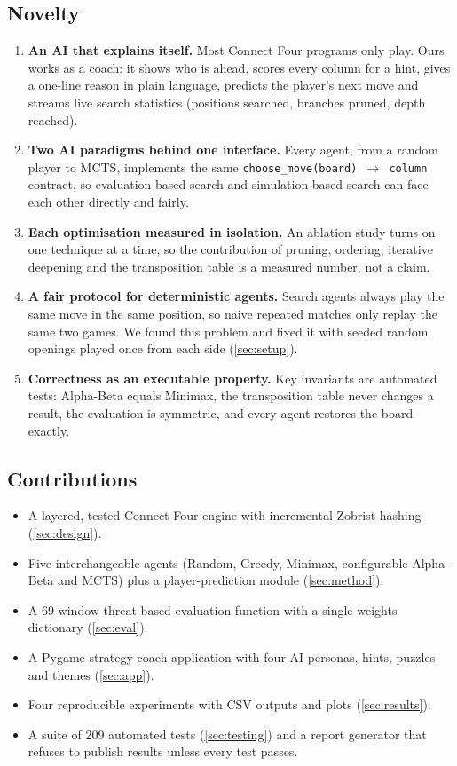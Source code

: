 \documentclass[11pt,a4paper]{article}
\newcommand{\code}[1]{\texttt{\small #1}}
\begin{document}
\subsection{Novelty}
\begin{enumerate}[label=\textbf{N\arabic*.},leftmargin=2.2em]
  \item \textbf{An AI that explains itself.} Most Connect Four programs only play. Ours works as a coach: it shows who is ahead, scores every column for a hint, gives a one-line reason in plain language, predicts the player's next move and streams live search statistics (positions searched, branches pruned, depth reached).
  \item \textbf{Two AI paradigms behind one interface.} Every agent, from a random player to MCTS, implements the same \code{choose\_move(board)\,$\to$\,column} contract, so evaluation-based search and simulation-based search can face each other directly and fairly.
  \item \textbf{Each optimisation measured in isolation.} An ablation study turns on one technique at a time, so the contribution of pruning, ordering, iterative deepening and the transposition table is a measured number, not a claim.
  \item \textbf{A fair protocol for deterministic agents.} Search agents always play the same move in the same position, so naive repeated matches only replay the same two games. We found this problem and fixed it with seeded random openings played once from each side (\cref{sec:setup}).
  \item \textbf{Correctness as an executable property.} Key invariants are automated tests: Alpha-Beta equals Minimax, the transposition table never changes a result, the evaluation is symmetric, and every agent restores the board exactly.
\end{enumerate}

\subsection{Contributions}
\begin{itemize}
  \item A layered, tested Connect Four engine with incremental Zobrist hashing (\cref{sec:design}).
  \item Five interchangeable agents (Random, Greedy, Minimax, configurable Alpha-Beta and MCTS) plus a player-prediction module (\cref{sec:method}).
  \item A 69-window threat-based evaluation function with a single weights dictionary (\cref{sec:eval}).
  \item A Pygame strategy-coach application with four AI personas, hints, puzzles and themes (\cref{sec:app}).
  \item Four reproducible experiments with CSV outputs and plots (\cref{sec:results}).
  \item A suite of 209 automated tests (\cref{sec:testing}) and a report generator that refuses to publish results unless every test passes.
\end{itemize}
\end{document}
